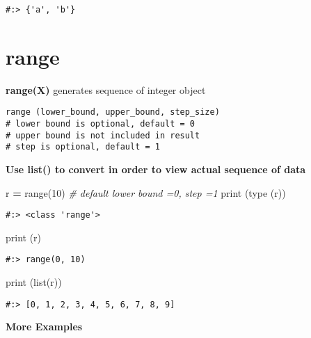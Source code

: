 \documentclass[
]{book}
\newenvironment{Shaded}{\begin{snugshade}}{\end{snugshade}}
\newcommand{\BuiltInTok}[1]{#1}
\newcommand{\CommentTok}[1]{\textcolor[rgb]{0.37,0.37,0.37}{\textit{#1}}}
\newcommand{\DecValTok}[1]{\textcolor[rgb]{0.06,0.06,0.06}{#1}}
\newcommand{\NormalTok}[1]{#1}
\newcommand{\OperatorTok}[1]{\textcolor[rgb]{0.43,0.43,0.43}{\textbf{#1}}}
\begin{document}
\begin{verbatim}
#:> {'a', 'b'}
\end{verbatim}

\hypertarget{range}{%
\section{range}\label{range}}

\textbf{range(X)} generates sequence of integer object

\begin{verbatim}
range (lower_bound, upper_bound, step_size)  
# lower bound is optional, default = 0
# upper bound is not included in result
# step is optional, default = 1
\end{verbatim}

\textbf{Use list() to convert in order to view actual sequence of data}

\begin{Shaded}
\begin{Highlighting}[]
\NormalTok{r }\OperatorTok{=} \BuiltInTok{range}\NormalTok{(}\DecValTok{10}\NormalTok{)     }\CommentTok{\# default lower bound =0, step =1}
\BuiltInTok{print}\NormalTok{ (}\BuiltInTok{type}\NormalTok{ (r))}
\end{Highlighting}
\end{Shaded}

\begin{verbatim}
#:> <class 'range'>
\end{verbatim}

\begin{Shaded}
\begin{Highlighting}[]
\BuiltInTok{print}\NormalTok{ (r)}
\end{Highlighting}
\end{Shaded}

\begin{verbatim}
#:> range(0, 10)
\end{verbatim}

\begin{Shaded}
\begin{Highlighting}[]
\BuiltInTok{print}\NormalTok{ (}\BuiltInTok{list}\NormalTok{(r))}
\end{Highlighting}
\end{Shaded}

\begin{verbatim}
#:> [0, 1, 2, 3, 4, 5, 6, 7, 8, 9]
\end{verbatim}

\textbf{More Examples}
\end{document}

